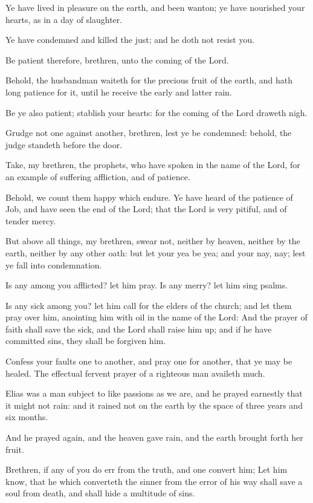 \Verse Ye have lived in pleasure on the earth, and been wanton; ye have nourished your hearts, as in a day of slaughter.

\Verse Ye have condemned and killed the just; and he doth not resist you.

\Verse Be patient therefore, brethren, unto the coming of the Lord.

Behold, the husbandman waiteth for the precious fruit of the earth, and hath long patience for it, until he receive the early and latter rain.

\Verse Be ye also patient; stablish your hearts: for the coming of the Lord draweth nigh.

\Verse Grudge not one against another, brethren, lest ye be condemned: behold, the judge standeth before the door.

\Verse Take, my brethren, the prophets, who have spoken in the name of the Lord, for an example of suffering affliction, and of patience.

\Verse Behold, we count them happy which endure. Ye have heard of the patience of Job, and have seen the end of the Lord; that the Lord is very pitiful, and of tender mercy.

\Verse But above all things, my brethren, swear not, neither by heaven, neither by the earth, neither by any other oath: but let your yea be yea; and your nay, nay; lest ye fall into condemnation.

\Verse Is any among you afflicted? let him pray. Is any merry? let him sing psalms.

\Verse Is any sick among you? let him call for the elders of the church; and let them pray over him, anointing him with oil in the name of the Lord: \Verse And the prayer of faith shall save the sick, and the Lord shall raise him up; and if he have committed sins, they shall be forgiven him.

\Verse Confess your faults one to another, and pray one for another, that ye may be healed. The effectual fervent prayer of a righteous man availeth much.

\Verse Elias was a man subject to like passions as we are, and he prayed earnestly that it might not rain: and it rained not on the earth by the space of three years and six months.

\Verse And he prayed again, and the heaven gave rain, and the earth brought forth her fruit.

\Verse Brethren, if any of you do err from the truth, and one convert him; \Verse Let him know, that he which converteth the sinner from the error of his way shall save a soul from death, and shall hide a multitude of sins.

